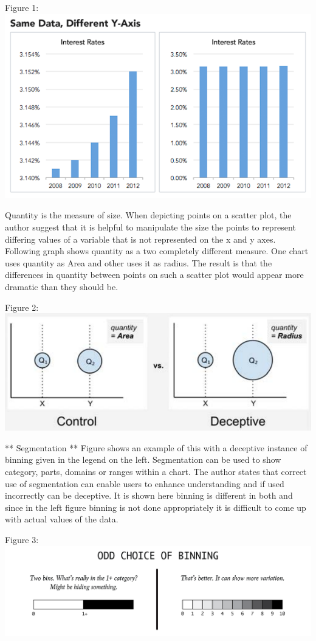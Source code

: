 \documentclass[]{book}
\theoremstyle{definition}
\theoremstyle{definition}
\theoremstyle{definition}
\theoremstyle{remark}
\begin{document}
Figure 1: \includegraphics{images/Size1.png}

Quantity is the measure of size. When depicting points on a scatter
plot, the author suggest that it is helpful to manipulate the size the
points to represent differing values of a variable that is not
represented on the x and y axes. Following graph shows quantity as a two
completely different measure. One chart uses quantity as Area and other
uses it as radius. The result is that the differences in quantity
between points on such a scatter plot would appear more dramatic than
they should be.

Figure 2: \includegraphics{images/Quantity1.png}

** Segmentation ** Figure shows an example of this with a deceptive
instance of binning given in the legend on the left. Segmentation can be
used to show category, parts, domains or ranges within a chart. The
author states that correct use of segmentation can enable users to
enhance understanding and if used incorrectly can be deceptive. It is
shown here binning is different in both and since in the left figure
binning is not done appropriately it is difficult to come up with actual
values of the data.

Figure 3: \includegraphics{images/Segmentation 1.png}
\end{document}
